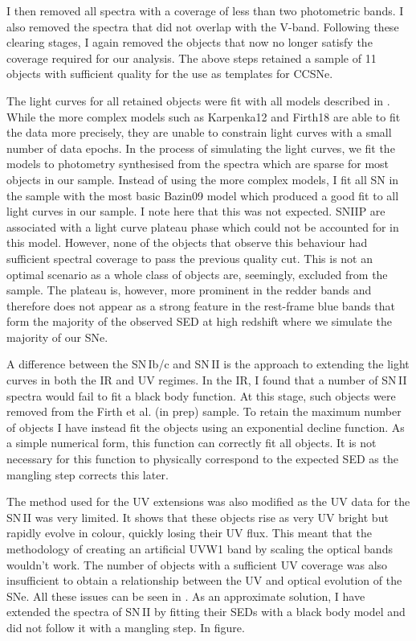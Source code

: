 I then removed all spectra with a coverage of less than two photometric bands. I also removed the spectra that did not overlap with the V-band. Following these clearing stages, I again removed the objects that now no longer satisfy the coverage required for our analysis. The above steps retained a sample of 11 objects with sufficient quality for the use as templates for CCSNe.

The light curves for all retained objects were fit with all models described in . While the more complex models such as Karpenka12 and Firth18 are able to fit the data more precisely, they are unable to constrain light curves with a small number of data epochs. In the process of simulating the light curves, we fit the models to photometry synthesised from the spectra which are sparse for most objects in our sample. Instead of using the more complex models, I fit all SN in the sample with the most basic Bazin09 model which produced a good fit to all light curves in our sample. I note here that this was not expected. SNIIP are associated with a light curve plateau phase which could not be accounted for in this model. However, none of the objects that observe this behaviour had sufficient spectral coverage to pass the previous quality cut. This is not an optimal scenario as a whole class of objects are, seemingly, excluded from the sample. The plateau is, however, more prominent in the redder bands and therefore does not appear as a strong feature in the rest-frame blue bands that form the majority of the observed SED at high redshift where we simulate the majority of our SNe.

A difference between the SN\,Ib/c and SN\,II is the approach to extending the light curves in both the IR and UV regimes. In the IR, I found that a number of SN\,II spectra would fail to fit a black body function. At this stage, such objects were removed from the Firth et al. (in prep) sample. To retain the maximum number of objects I have instead fit the objects using an exponential decline function. As a simple numerical form, this function can correctly fit all objects. It is not necessary for this function to physically correspond to the expected SED as the mangling step corrects this later.

The method used for the UV extensions was also modified as the UV data for the SN\,II was very limited. It shows that these objects rise as very UV bright but rapidly evolve in colour, quickly losing their UV flux. This meant that the methodology of creating an artificial UVW1 band by scaling the optical bands wouldn't work. The number of objects with a sufficient UV coverage was also insufficient to obtain a relationship between the UV and optical evolution of the SNe. All these issues can be seen in . As an approximate solution, I have extended the spectra of SN\,II by fitting their SEDs with a black body model and did not follow it with a mangling step. In figure.


